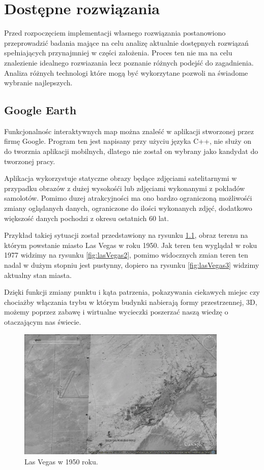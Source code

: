 ﻿\chapter{Dostępne rozwiązania}
\label{cha:dostepnerozwiazania}

Przed rozpoczęciem implementacji własnego rozwiązania postanowiono przeprowadzić badania mające na celu analizę aktualnie dostępnych rozwiązań spełniających przynajmniej w części założenia. Proces ten nie ma na celu znalezienie idealnego rozwiazania lecz poznanie różnych podejść do zagadnienia. Analiza różnych technologi które mogą być wykorzytane pozwoli na świadome wybranie najlepszych.


\section{Google Earth}
\label{sec:Google Earth}

Funkcjonalnośc interaktywnych map można znaleść w aplikacji stworzonej przez firmę Google. Program ten jest napisany przy użyciu języka C++, nie służy on do tworznia aplikacji mobilnych, dlatego nie został on wybrany jako kandydat do tworzonej pracy.

Aplikacja wykorzystuje statyczne obrazy będące zdjęciami satelitarnymi w przypadku obrazów z dużej wysokośći lub zdjęciami wykonanymi z pokładów samolotów. Pomimo duzej atrakcyjności ma ono bardzo ograniczoną możliwośći zmiany oglądanych danych, ograniczone do ilości wykonanych zdjęć, dodatkowo większość danych pochodzi z okresu ostatnich 60 lat.

Przykład takiej sytuacji został przedstawiony na rysunku \ref{fig:lasVegas1}, obraz terenu na którym powstanie miasto Las Vegas w roku 1950. Jak teren ten wyglądał w roku 1977 widzimy na rysunku \ref{fig:lasVegas2}, pomimo widocznych zmian teren ten nadal w dużym stopniu jest pustynny, dopiero na rysunku \ref{fig:lasVegas3} widzimy aktualny stan miasta.

Dzięki funkcji zmiany punktu i kąta patrzenia, pokazywania ciekawych miejsc czy chociażby włączania trybu w którym budynki nabierają formy przestrzennej, 3D, możemy poprzez zabawę i wirtualne wycieczki poszerzać naszą wiedzę o otaczającym nas świecie.


\begin{figure}[H]
  \centering
    \includegraphics[width=100mm]{ge/01_1950.jpg}
  \caption{Las Vegas w 1950 roku.}
  \label{fig:lasVegas1}
\end{figure}

